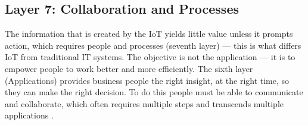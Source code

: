 
\subsection{Layer 7: Collaboration and Processes}
\label{sec:iot-model-layer7}


The information that is created by the \acs{IoT} yields little value unless it prompts action, which requires people and processes (seventh layer) — this is what differs \acs{IoT} from traditional \acl{IT} systems. The objective is not the application — it is to empower people to work better and more efficiently. The sixth layer (Applications) provides business people the right insight, at the right time, so they can make the right decision. To do this people must be able to communicate and collaborate, which often requires multiple steps and transcends multiple applications \cite{Cisco2014}.

